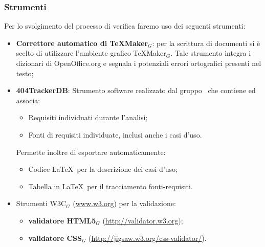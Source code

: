 \subsubsection{Strumenti}
Per lo svolgimento del processo di verifica faremo uso dei seguenti strumenti:
\begin{itemize}
	\item \textbf{Correttore automatico di TeXMaker$_G$}: per la scrittura di documenti si è scelto di utilizzare l'ambiente grafico TeXMaker$_G$. Tale strumento integra i dizionari di OpenOffice.org e segnala i potenziali errori ortografici presenti nel testo;
	
	\item \textbf{404TrackerDB}: Strumento software realizzato dal gruppo \gruppo\ che contiene ed associa:
	\begin{itemize}
		\item Requisiti individuati durante l'analisi;
		\item Fonti di requisiti individuate, inclusi anche i casi d'uso.
	\end{itemize}
	Permette inoltre di esportare automaticamente:
	\begin{itemize}
		\item Codice \LaTeX\ per la descrizione dei casi d'uso;
		\item Tabella in \LaTeX\ per il tracciamento fonti-requisiti.
	\end{itemize}

	\item Strumenti W3C$_G$ (\href{www.w3.org}{www.w3.org}) per la validazione:
	    \begin{itemize}
	    	\item \textbf{validatore HTML5$_G$} (\href{http://validator.w3.org}{http://validator.w3.org});
	    	\item \textbf{validatore CSS$_G$}
	    	(\href{http://jigsaw.w3.org/css-validator/}{http://jigsaw.w3.org/css-validator/}).
	    \end{itemize}
	

\end{itemize}
